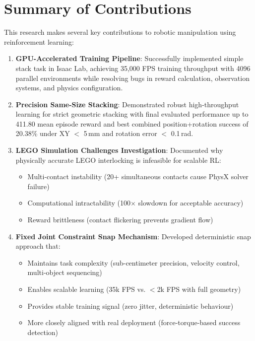 \documentclass[12pt,a4paper,oneside]{report}
\begin{document}
\section{Summary of Contributions}

This research makes several key contributions to robotic manipulation using reinforcement learning:

\begin{enumerate}
    \item \textbf{GPU-Accelerated Training Pipeline}: Successfully implemented simple stack task in Isaac Lab, achieving 35,000 FPS training throughput with 4096 parallel environments while resolving bugs in reward calculation, observation systems, and physics configuration.

    \item \textbf{Precision Same-Size Stacking}: Demonstrated robust high-throughput learning for strict geometric stacking with final evaluated performance up to 411.80 mean episode reward and best combined position+rotation success of 20.38\% under XY $<$ 5\,mm and rotation error $<$ 0.1\,rad.

    \item \textbf{LEGO Simulation Challenges Investigation}: Documented why physically accurate LEGO interlocking is infeasible for scalable RL:
    \begin{itemize}
        \item Multi-contact instability (20+ simultaneous contacts cause PhysX solver failure)
        \item Computational intractability (100$\times$ slowdown for acceptable accuracy)
        \item Reward brittleness (contact flickering prevents gradient flow)
    \end{itemize}

    \item \textbf{Fixed Joint Constraint Snap Mechanism}: Developed deterministic snap approach that:
    \begin{itemize}
        \item Maintains task complexity (sub-centimeter precision, velocity control, multi-object sequencing)
        \item Enables scalable learning (35k FPS vs. $<$2k FPS with full geometry)
        \item Provides stable training signal (zero jitter, deterministic behaviour)
        \item More closely aligned with real deployment (force-torque-based success detection)
    \end{itemize}


\end{enumerate}
\end{document}
